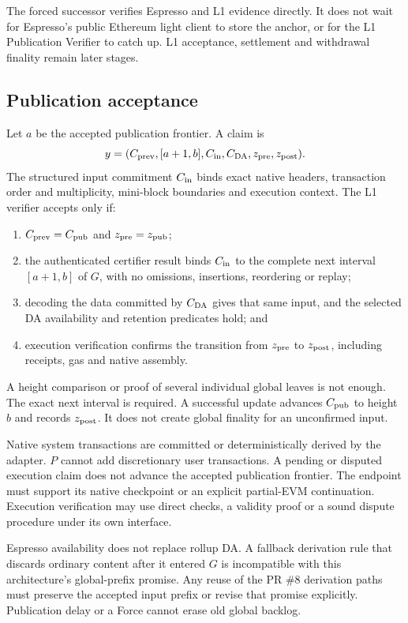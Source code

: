 \documentclass[11pt,a4paper]{article}
\begin{document}
The forced successor verifies Espresso and L1 evidence directly.
It does not wait for Espresso's public Ethereum light client to store
the anchor, or for the L1 Publication Verifier to catch up. L1 acceptance,
settlement and withdrawal finality remain later stages.

\subsection{Publication acceptance}
Let $a$ be the accepted publication frontier. A claim is
\[
 y=(C_{\rm prev},[a+1,b],C_{\rm in},C_{\rm DA},z_{\rm pre},z_{\rm post}).
\]
The structured input commitment $C_{\rm in}$ binds exact native headers,
transaction order and multiplicity, mini-block boundaries and execution
context. The L1 verifier accepts only if:
\begin{enumerate}
\item $C_{\rm prev}=C_{\rm pub}$ and $z_{\rm pre}=z_{\rm pub}$;
\item the authenticated certifier result binds $C_{\rm in}$ to the
complete next interval $[a+1,b]$ of $G$, with no omissions, insertions,
reordering or replay;
\item decoding the data committed by $C_{\rm DA}$ gives that same input,
and the selected DA availability and retention predicates hold; and
\item execution verification confirms the transition from $z_{\rm pre}$
to $z_{\rm post}$, including receipts, gas and native assembly.
\end{enumerate}
A height comparison or proof of several individual global leaves is
not enough. The exact next interval is required. A successful update
advances $C_{\rm pub}$ to height $b$ and records $z_{\rm post}$.
It does not create global finality for an unconfirmed input.

Native system transactions are committed or deterministically derived
by the adapter. $P$ cannot add discretionary user transactions. A pending
or disputed execution claim does not advance the accepted publication
frontier. The endpoint must support its native checkpoint or an explicit
partial-EVM continuation. Execution verification may use direct checks,
a validity proof or a sound dispute procedure under its own interface.

Espresso availability does not replace rollup DA. A fallback derivation
rule that discards ordinary content after it entered $G$ is incompatible
with this architecture's global-prefix promise. Any reuse of the PR
\#8 derivation paths must preserve the accepted input prefix or revise
that promise explicitly. Publication delay or a Force cannot erase
old global backlog.
\end{document}
